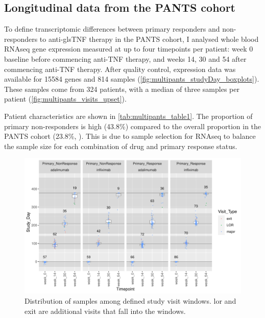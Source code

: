 \begin{outline}
\subsection{Longitudinal  data from the \gls{PANTS} cohort}

To define transcriptomic differences between primary responders and non-responders to anti-gls{TNF} therapy in the \gls{PANTS} cohort, 
I analysed whole blood \gls{RNAseq} gene expression measured at up to four timepoints per patient:
week 0 baseline before commencing anti-\gls{TNF} therapy, and weeks 14, 30 and 54 after commencing anti-\gls{TNF} therapy.
After quality control, expression data was available for 15584 genes and 814 samples (\autoref{fig:multipants_studyDay_boxplots}).
These samples come from 324 patients, with a median of three samples per patient (\autoref{fig:multipants_visits_upset}).

Patient characteristics are shown in \autoref{tab:multipants_table1}.
The proportion of primary non-responders is high (43.8\%) compared to the overall proportion in the \gls{PANTS} cohort (23.8\%, \autocite{kennedy2019PredictorsAntiTNFTreatment}).
This is due to sample selection for \gls{RNAseq} to balance the sample size for each combination of drug and primary response status.

\begin{figure}
    \centering
    \includegraphics[width=1.0\textwidth,page=1]{mainmatter/figures/chapter_04/process_pheno.pheno_filtered_dge.Study_Day_vs_Visit_Label.pdf}
    \caption{Distribution of samples among defined study visit windows. lor and exit are additional visits that fall into the windows.}
    \label{fig:multipants_studyDay_boxplots}
\end{figure}


\end{outline}
